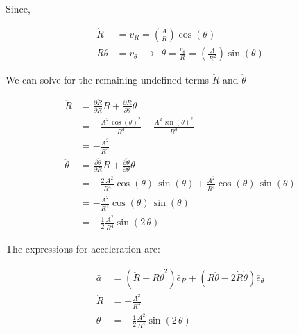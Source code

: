 \documentclass[12pt, letterpaper]{../assignment}
\begin{document}
Since,

\begin{equation*}
\begin{aligned}
\dot{R} &= v_R = \left(\frac{A}{R}\right)\cos(\theta)\\
R \dot{\theta} &= v_\theta \ \ \rightarrow \ \ \dot{\theta} = \frac{v_\theta}{R} = \left(\frac{A}{R^2}\right)\sin(\theta) 
\end{aligned}
\end{equation*}

We can solve for the remaining undefined terms $\ddot{R}$ and $\ddot{\theta}$

\begin{equation*}
   \begin{aligned}
       \ddot{R} &= \frac{\partial \dot{R}}{\partial R} \dot{R} + \frac{\partial \dot{R}}{\partial \theta} \dot{\theta}\\
       &= -\frac{A^2\,{\cos\left(\theta \right)}^2}{R^3}
       -\frac{A^2\,{\sin\left(\theta \right)}^2}{R^3}\\
       &= -\frac{A^2}{R^3}\\
       \ddot{\theta} &= \frac{\partial \dot{\theta}}{\partial R} \dot{R} + \frac{\partial \dot{\theta}}{\partial \theta} \dot{\theta}\\
       &= -\frac{2\,A^2}{R^4} \cos\left(\theta \right)\,\sin\left(\theta \right)
       +\frac{A^2}{R^4}\cos\left(\theta \right)\,\sin\left(\theta \right)\\
       &= -\frac{A^2}{R^4} \cos\left(\theta \right)\,\sin\left(\theta \right)\\
       &= -\frac{1}{2}\frac{A^2}{R^4}\sin\left(2\,\theta \right)
   \end{aligned}
\end{equation*}

The expressions for acceleration are:

\begin{answer}
\begin{equation*}
   \begin{aligned}
       \bar{a} &= \left( \ddot{R} - R \dot{\theta}^2 \right) \bar{e}_R +
           \left( R \ddot{\theta} - 2 \dot{R} \dot{\theta} \right) \bar{e}_\theta\\
       \ddot{R} &= -\frac{A^2}{R^3}\\
       \ddot{\theta} &= -\frac{1}{2}\frac{A^2}{R^4}\sin\left(2\,\theta \right)
   \end{aligned}
\end{equation*}
\end{answer}
\end{document}
